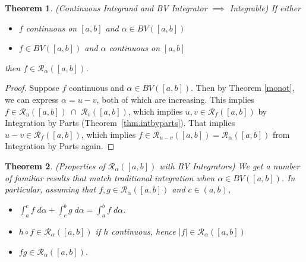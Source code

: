 \documentclass[12pt]{book}
\numberwithin{equation}{section} %
\theoremstyle{plain}
\newtheorem{thm}{Theorem}[section]
\theoremstyle{definition}
\theoremstyle{remark}
\newcommand{\sR}{\mathscr{R}}
\begin{document}
\begin{thm}
\emph{(Continuous Integrand and BV Integrator $\implies$ Integrable)}
If either
\begin{itemize}
  \item $f$ continuous on $[a,b]$ and $\alpha\in BV([a,b])$
  \item $f\in BV([a,b])$ and $\alpha$ continuous on $[a,b]$
\end{itemize}
then $f\in\mathscr{R}_\alpha([a,b])$.
\end{thm}
\begin{proof}
Suppose $f$ continuous and $\alpha\in BV([a,b])$. Then by Theorem
\ref{monot}, we can express $\alpha = u -v$, both of which are
increasing.
This implies $f\in\mathscr{R}_u([a,b]) \;\cap \;\mathscr{R}_v([a,b])$,
which implies $u, v \in \mathscr{R}_f([a,b])$ by Integration by Parts
(Theorem~\ref{thm.intbyparts}). 
That implies $u-v\in\mathscr{R}_f([a,b])$, which implies
$f\in\mathscr{R}_{u-v}([a,b]) = \mathscr{R}_\alpha([a,b])$
from Integration by Parts again.
\end{proof}

\begin{thm}
\emph{(Properties of $\sR_\alpha([a,b])$ with BV Integrators)}
We get a number of familiar results that match traditional integration
when $\alpha\in BV([a,b])$.
In particular, assuming that $f,g\in\mathscr{R}_\alpha([a,b])$
and $c\in(a,b)$,
\begin{itemize}
  \item $\int^c_a f\;d\alpha + \int^b_c g\;d\alpha = \int^b_a f\;d\alpha$.
  \item $h\circ f\in\mathscr{R}_\alpha([a,b])$
    if $h$ continuous,
    hence  $|f|\in\mathscr{R}_\alpha([a,b])$
  \item $fg\in\mathscr{R}_\alpha([a,b])$.
\end{itemize}
\end{thm}
\end{document}
